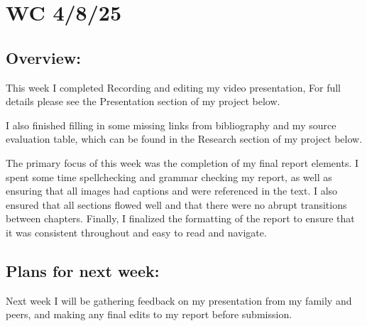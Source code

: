 \section{WC 4/8/25}
\subsection*{Overview:}
This week I completed Recording and editing my video presentation, For full details please see the Presentation section of my project below.

I also finished filling in some missing links from bibliography and my source evaluation table, which can be found in the Research section of my project below.

The primary focus of this week was the completion of my final report elements. I spent some time spellchecking and grammar checking my report, as well as ensuring that all images had captions and were referenced in the text. I also ensured that all sections flowed well and that there were no abrupt transitions between chapters. Finally, I finalized the formatting of the report to ensure that it was consistent throughout and easy to read and navigate.
\subsection*{Plans for next week:}
Next week I will be gathering feedback on my presentation from my family and peers, and making any final edits to my report before submission.